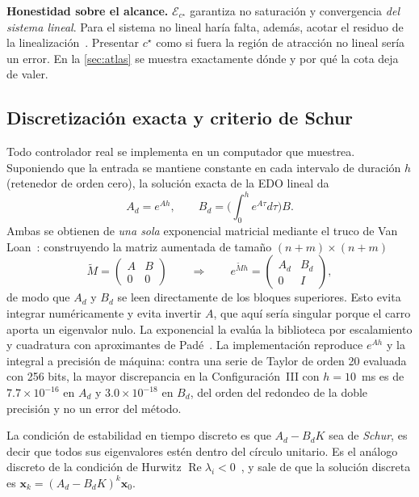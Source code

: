 \documentclass[11pt,letterpaper]{article}
\theoremstyle{definition}
\theoremstyle{plain}
\theoremstyle{remark}
\DeclareMathOperator{\Real}{Re}
\newcommand{\calE}{\mathcal{E}}
\newcommand{\xv}{\bm{x}}
\begin{document}
\begin{alerta}
\small
\textbf{Honestidad sobre el alcance.} $\calE_{c^\star}$ garantiza no saturación
y convergencia \emph{del sistema lineal}. Para el sistema no lineal haría falta,
además, acotar el residuo de la linealización~\cite{khalil2002}. Presentar
$c^\star$ como si fuera
la región de atracción no lineal sería un error. En la \cref{sec:atlas} se
muestra exactamente dónde y por qué la cota deja de valer.
\end{alerta}

\subsection{Discretización exacta y criterio de Schur}
\label{sec:zoh}

Todo controlador real se implementa en un computador que muestrea. Suponiendo
que la entrada se mantiene constante en cada intervalo de duración $h$
(retenedor de orden cero), la solución exacta de la EDO lineal da
\[
A_d=e^{Ah},\qquad B_d=\Big(\int_0^h e^{A\tau}d\tau\Big)B.
\]
Ambas se obtienen de \emph{una sola} exponencial matricial mediante el truco de
Van Loan~\cite{vanloan1978}: construyendo la matriz aumentada de tamaño
$(n+m)\times(n+m)$
\[
\widetilde M=\begin{pmatrix}A&B\\0&0\end{pmatrix}
\qquad\Longrightarrow\qquad
e^{\widetilde M h}=\begin{pmatrix}A_d&B_d\\0&I\end{pmatrix},
\]
de modo que $A_d$ y $B_d$ se leen directamente de los bloques superiores. Esto
evita integrar numéricamente y evita invertir $A$, que aquí sería singular
porque el carro aporta un eigenvalor nulo. La exponencial la evalúa la
biblioteca por escalamiento y cuadratura con aproximantes de
Padé~\cite[Alg.~9.3.1]{golub2013}. La implementación reproduce $e^{Ah}$ y la
integral a precisión de máquina: contra una serie de Taylor de orden 20 evaluada
con 256 bits, la mayor discrepancia en la Configuración~III con $h=10$~ms es de
$7.7\times10^{-16}$ en $A_d$ y $3.0\times10^{-18}$ en $B_d$, del orden del
redondeo de la doble precisión y no un error del método.

La condición de estabilidad en tiempo discreto es que $A_d-B_dK$ sea de
\emph{Schur}, es decir que todos sus eigenvalores estén dentro del círculo
unitario. Es el análogo discreto de la condición de Hurwitz
$\Real\lambda_i<0$~\cite[Thm.~10.16]{olver2018}, y sale de que la solución
discreta es $\xv_k=(A_d-B_dK)^k\xv_0$.
\end{document}
